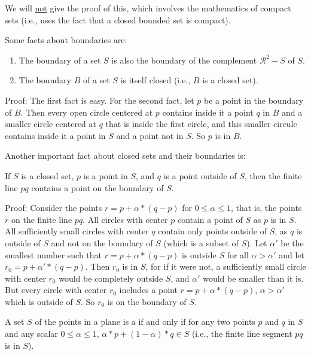 \documentclass[12pt]{article}
\begin{document}
We will \underline{not} give the proof of this,
which involves the mathematics of compact
sets (i.e., uses the fact that a closed bounded set is compact).

Some facts about boundaries are:
\begin{enumerate}
\item The boundary of a set $S$ is also the boundary of the
complement $\mathcal{R}^2-S$ of $S$.
\item The boundary $B$ of a set $S$ is itself closed
(i.e., $B$ is a closed set).
\end{enumerate}
\begin{indpar}{0.3in}
Proof:  The first fact is easy.  For the second fact, let
$p$ be a point in the
boundary of $B$.  Then every open circle centered at $p$
contains inside it a point $q$ in $B$ and a smaller circle
centered at $q$ that is inside the first circle, and this
smaller circule contains
inside it a point in $S$ and a point not in $S$.  So $p$ is in $B$.
\end{indpar}


Another important fact about closed sets and their boundaries is:

\begin{lemma}\label{BOUNDARY-CROSSING}
If $S$ is a closed set, $p$ is a point in $S$, and $q$ is a point
outside of $S$, then the finite line $pq$ contains a point on the
boundary of $S$.
\end{lemma}
\begin{indpar}{0.2in}
Proof: Consider the points $r=p+\alpha*(q-p)$ for $0\le\alpha\le 1$,
that is, the points $r$ on the finite line $pq$.
All circles with center $p$ contain a point of $S$ as $p$ is in $S$.
All sufficiently small circles with center $q$ contain only points
outside of $S$, as $q$ is outside of $S$ and not on the boundary of $S$
(which is a subset of $S$).  Let $\alpha'$ be the smallest number such
that $r=p+\alpha*(q-p)$ is outside $S$ for all $\alpha>\alpha'$ and
let $r_0=p+\alpha'*(q-p)$.  Then $r_0$ is in $S$, for if it were not,
a sufficiently small circle with center $r_0$ would be completely
outside $S$, and $\alpha'$ would be smaller than it is.  But every
circle with center $r_0$ includes a point $r=p+\alpha*(q-p)$,
$\alpha>\alpha'$ which
is outside of $S$.  So $r_0$ is on the boundary of $S$.
\end{indpar}

\begin{definition}
A set $S$ of the points in a plane
is a  if and only if for any two points $p$ and $q$ in $S$
and any scalar $0\le\alpha\le 1$,
$\alpha*p+(1-\alpha)*q \in S$
(i.e., the finite line segment $pq$ is in $S$).
\end{definition}
\end{document}

